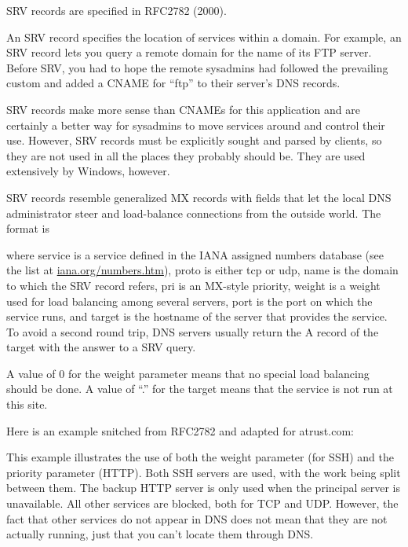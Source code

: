 \leavevmode\hypertarget{part0024_split_029.htmlux5cux23_idContainer962}{}%
SRV records are specified in RFC2782 (2000).

An SRV record specifies the location of services within a domain. For
example, an SRV record lets you query a remote domain for the name of
its FTP server. Before SRV, you had to hope the remote sysadmins had
followed the prevailing custom and added a CNAME for ``ftp'' to their
server's DNS records.

SRV records make more sense than CNAMEs for this application and are
certainly a better way for sysadmins to move services around and control
their use. However, SRV records must be explicitly sought and parsed by
clients, so they are not used in all the places they probably should be.
They are used extensively by Windows, however.

SRV records resemble generalized MX records with fields that let the
local DNS administrator steer and load-balance connections from the
outside world. The format is


where {service} is a service defined in the IANA assigned numbers
database (see the list at
\href{http://iana.org/numbers.htm}{iana.org/numbers.htm}), {proto} is
either {tcp} or {udp}, {name} is the domain to which the SRV record
refers, {pri} is an MX-style priority, {weight} is a weight used for
load balancing among several servers, {port} is the port on which the
service runs, and {target} is the hostname of the server that provides
the service. To avoid a second round trip, DNS servers usually return
the A record of the target with the answer to a SRV query.

A value of 0 for the {weight} parameter means that no special load
balancing should be done. A value of ``.'' for the target means that the
service is not run at this site.

Here is an example snitched from RFC2782 and adapted for atrust.com:


This example illustrates the use of both the weight parameter (for SSH)
and the priority parameter (HTTP). Both SSH servers are used, with the
work being split between them. The backup HTTP server is only used when
the principal server is unavailable. All other services are blocked,
both for TCP and UDP. However, the fact that other services do not
appear in DNS does not mean that they are not actually running, just
that you can't locate them through DNS.

